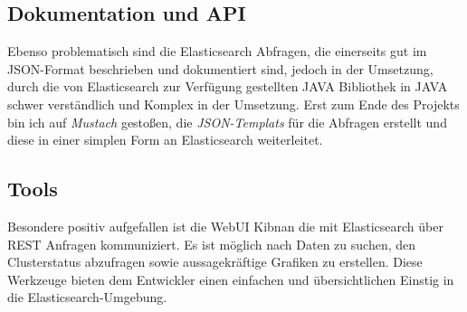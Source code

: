 \subsection{Dokumentation und API}
Ebenso problematisch sind die Elasticsearch Abfragen, die einerseits gut im JSON-Format beschrieben und dokumentiert sind, jedoch in der Umsetzung, durch die von Elasticsearch zur Verfügung gestellten JAVA Bibliothek in JAVA schwer verständlich und Komplex in der Umsetzung.
Erst zum Ende des Projekts bin ich auf \textit{Mustach} gestoßen, die \textit{JSON-Templats} für die Abfragen erstellt und diese in einer simplen Form an Elasticsearch weiterleitet.  

\subsection{Tools}
Besondere positiv aufgefallen ist die WebUI Kibnan die mit Elasticsearch über REST Anfragen kommuniziert. Es ist möglich nach Daten zu suchen, den Clusterstatus abzufragen sowie aussagekräftige Grafiken zu erstellen. Diese Werkzeuge bieten dem Entwickler einen einfachen und übersichtlichen Einstig in die Elasticsearch-Umgebung. 
